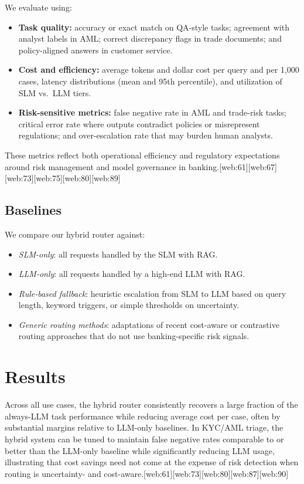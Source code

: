 \documentclass[11pt]{article}
\begin{document}
We evaluate using:
\begin{itemize}
    \item \textbf{Task quality:} accuracy or exact match on QA-style tasks; agreement with analyst labels in AML; correct discrepancy flags in trade documents; and policy-aligned answers in customer service.
    \item \textbf{Cost and efficiency:} average tokens and dollar cost per query and per 1{,}000 cases, latency distributions (mean and 95th percentile), and utilization of SLM vs.\ LLM tiers.
    \item \textbf{Risk-sensitive metrics:} false negative rate in AML and trade-risk tasks; critical error rate where outputs contradict policies or misrepresent regulations; and over-escalation rate that may burden human analysts.
\end{itemize}

These metrics reflect both operational efficiency and regulatory expectations around risk management and model governance in banking.[web:61][web:67][web:73][web:75][web:80][web:89]

\subsection{Baselines}

We compare our hybrid router against:
\begin{itemize}
    \item \emph{SLM-only}: all requests handled by the SLM with RAG.
    \item \emph{LLM-only}: all requests handled by a high-end LLM with RAG.
    \item \emph{Rule-based fallback}: heuristic escalation from SLM to LLM based on query length, keyword triggers, or simple thresholds on uncertainty.
    \item \emph{Generic routing methods}: adaptations of recent cost-aware or contrastive routing approaches that do not use banking-specific risk signals.
\end{itemize}

\section{Results}

Across all use cases, the hybrid router consistently recovers a large fraction of the always-LLM task performance while reducing average cost per case, often by substantial margins relative to LLM-only baselines. In KYC/AML triage, the hybrid system can be tuned to maintain false negative rates comparable to or better than the LLM-only baseline while significantly reducing LLM usage, illustrating that cost savings need not come at the expense of risk detection when routing is uncertainty- and cost-aware.[web:61][web:73][web:80][web:87][web:90]
\end{document}
